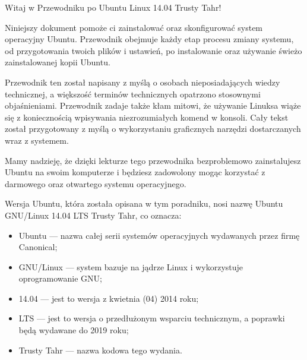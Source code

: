 \noindent Witaj w \textcolor{ubuntu_orange}{Przewodniku po Ubuntu Linux 14.04 Trusty Tahr!}

Niniejszy dokument pomoże ci zainstalować oraz skonfigurować system operacyjny Ubuntu. Przewodnik obejmuje każdy etap procesu zmiany systemu, od przygotowania twoich plików i ustawień, po instalowanie oraz używanie świeżo zainstalowanej kopii Ubuntu.

Przewodnik ten został napisany z myślą o osobach nieposiadających wiedzy technicznej, a większość terminów technicznych opatrzono stosownymi objaśnieniami. Przewodnik zadaje także kłam mitowi, że używanie Linuksa wiąże się z koniecznością wpisywania niezrozumiałych komend w konsoli. Cały tekst został przygotowany z myślą o wykorzystaniu graficznych narzędzi dostarczanych wraz z systemem.

Mamy nadzieję, że dzięki lekturze tego przewodnika bezproblemowo zainstalujesz Ubuntu na swoim komputerze i będziesz zadowolony mogąc korzystać z darmowego oraz otwartego systemu operacyjnego.

Wersja Ubuntu, która została opisana w tym poradniku, nosi nazwę Ubuntu GNU/Linux 14.04 LTS Trusty Tahr, co oznacza:
\begin{itemize}
\item \textcolor{ubuntu_orange}{Ubuntu} ---  nazwa całej serii systemów operacyjnych wydawanych przez firmę Canonical;
\item \textcolor{ubuntu_orange}{GNU/Linux} --- system bazuje na jądrze Linux i wykorzystuje oprogramowanie GNU;
\item \textcolor{ubuntu_orange}{14.04} --- jest to wersja z kwietnia (04) 2014 roku;
\item \textcolor{ubuntu_orange}{LTS} --- jest to wersja o przedłużonym wsparciu technicznym, a poprawki będą wydawane do 2019 roku;
\item \textcolor{ubuntu_orange}{Trusty Tahr} --- nazwa kodowa tego wydania.
\end{itemize}
